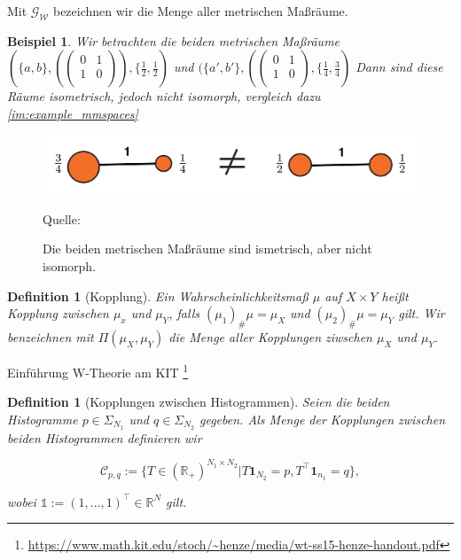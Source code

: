 \documentclass[11pt,a4paper]{article}
\newcommand{\source}[1]{\caption*{\hfill Quelle: {#1}} }
\newtheorem{definition}[theorem]{Definition}
\newtheorem{example}[theorem]{Beispiel}
\numberwithin{equation}{section}
\begin{document}
	Mit $\mathcal{G}_\mathcal{W}$ bezeichnen wir die Menge aller metrischen Maßräume.
	
	\begin{example}
		Wir betrachten die beiden metrischen Maßräume $(\lbrace a,b \rbrace, (\begin{pmatrix}
		0 & 1\\
		1 & 0 \\
		\end{pmatrix}), \lbrace \frac{1}{2},\frac{1}{2})$ und 
		$(\lbrace a',b' \rbrace, (
		\begin{pmatrix}
		0 & 1\\
		1 & 0 \\
		\end{pmatrix}, \lbrace \frac{1}{4},\frac{3}{4})$
		Dann sind diese Räume isometrisch, jedoch nicht isomorph, vergleich dazu \autoref{im:example_mmspaces}
	\end{example}
	
	\begin{figure}[ht]
		\centering
		\includegraphics[width=0.3\textheight]{example_mmspaces.png}
		\caption[Beispiel isometrischer metrischer Maßräume]{Die beiden metrischen Maßräume sind ismetrisch, aber nicht isomorph.}
		\source{\cite{COTcuturi}}
		\label{im:example_mmspaces}
	\end{figure}
	
	
	\begin{definition}[Kopplung]
		Ein Wahrscheinlichkeitsmaß $\mu$ auf $X \times Y$ heißt Kopplung zwischen $\mu_x$ und $\mu_Y$, falls $(\mu_1)_\#\mu = \mu_X$ und $(\mu_2)_\#\mu = \mu_Y$ gilt. Wir benzeichnen mit $\Pi(\mu_X,\mu_Y)$ die Menge aller Kopplungen ziwschen $\mu_X$ und $\mu_Y$.
	\end{definition}
	
	
	Einführung W-Theorie am KIT \footnote{\url{https://www.math.kit.edu/stoch/~henze/media/wt-ss15-henze-handout.pdf}}
	\begin{definition}[Kopplungen zwischen Histogrammen]
		Seien die beiden Histogramme $p \in \Sigma_{N_1}$ und $q \in \Sigma_{N_2}$ gegeben.
		Als Menge der Kopplungen zwischen beiden Histogrammen definieren wir
		
		\begin{equation*}
		\mathcal{C}_{p,q} := \lbrace T \in (\mathbb{R}_+)^{N_1 \times N_2} | T \boldsymbol{1}_{N_2} = p, T^\top \boldsymbol{1}_{n_1} = q \rbrace,
		\end{equation*}	
		
		wobei $\mathbb{1} := (1,...,1)^\top \in \mathbb{R}^{N}$ gilt.
	\end{definition}
	
\end{document}
